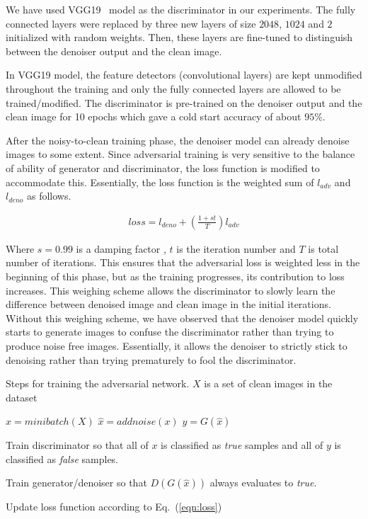 \documentclass[10pt,twocolumn,letterpaper]{proc}
\begin{document}
We have used VGG19~\cite{simonyan2014very} model as the discriminator in our experiments. The fully connected layers were replaced by three new layers of size $2048$, $1024$ and $2$ initialized with random weights. 
Then, these layers are fine-tuned to distinguish between the denoiser output and the clean image.


In VGG19 model, the feature detectors (convolutional layers) are kept unmodified throughout the training and only the fully connected layers are allowed to be trained/modified. The discriminator is pre-trained on the denoiser output and the clean image for 10 epochs which gave a cold start accuracy of about $95\%$.



After the noisy-to-clean training phase, the denoiser model can already denoise images to some extent. Since adversarial training is very sensitive to the balance of ability of generator and discriminator, the loss function is modified to accommodate this. 
Essentially, the loss function is the weighted sum of $l_{adv}$ and $l_{deno}$ as follows.

\begin{align}
    loss = l_{deno} + \left(\frac{1+st}{T}\right)l_{adv}
    \label{eqn:loss}
\end{align}

Where $s=0.99$ is a damping factor , $t$ is the iteration number and $T$ is total number of iterations. This ensures that the adversarial loss is weighted less in the beginning of this phase, but as the training progresses, its contribution to loss increases. This weighing scheme allows the discriminator to slowly learn the difference between denoised image and clean image in the initial iterations. Without this weighing scheme, we have observed that the denoiser model quickly starts to generate images to confuse the discriminator rather than trying to produce noise free images. Essentially, it allows the denoiser to strictly stick to denoising rather than trying prematurely to fool the discriminator.




\begin{algorithm}
\caption{Steps for training the adversarial network. $X$ is a set of clean images in the dataset}\label{alg:adv}
\begin{algorithmic}[1]
    \State $x = minibatch(X)$
    \State $\hat{x} = addnoise(x)$
    \State $y = G(\hat{x})$
    \State \parbox[t]{0.38\textwidth}{Train discriminator so that all of $x$ is classified as \emph{true} samples and all of $y$ is classified as \emph{false} samples.}
    \State \parbox[t]{0.38\textwidth}{Train generator/denoiser so that $D(G(\hat{x}))$ always evaluates to \emph{true}.} 
    \State Update loss function according to Eq.~(\ref{eqn:loss})
\EndWhile
\EndProcedure
\end{algorithmic}
\end{algorithm}
\end{document}
